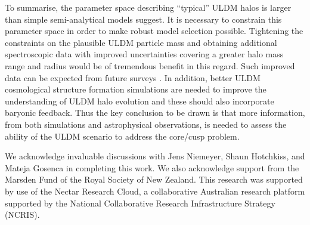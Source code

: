 \documentclass{pasa}%
\begin{document}
To summarise, the parameter space describing ``typical'' ULDM halos is larger than simple semi-analytical models suggest. It is necessary to constrain this parameter space in order to make robust model selection possible. Tightening the constraints on the plausible ULDM particle mass \cite{Castellano:2019hdd, Lidz:2018fqo, Davoudiasl:2019nlo} and obtaining additional spectroscopic data with improved uncertainties covering a greater halo mass range and radius would be of tremendous benefit in this regard. Such improved data can be expected from future surveys \cite{Simon:2019kmm}. In addition, better ULDM cosmological structure formation simulations are needed to  improve the understanding of ULDM halo evolution \cite{Lin:2018whl, Clough:2018exo, Mocz:2015sda} and these should also incorporate baryonic feedback. Thus the key conclusion to be drawn is that more information, from both simulations and astrophysical observations, is needed  to  assess the ability of the ULDM scenario to address the core/cusp problem. 



\begin{acknowledgements}
We acknowledge invaluable discussions with Jens Niemeyer, Shaun Hotchkiss, and Mateja Gosenca in completing this work. We also acknowledge support from the Marsden Fund of the Royal Society of New Zealand. This research was supported by use of the Nectar Research Cloud, a collaborative Australian research platform supported by the National Collaborative Research Infrastructure Strategy (NCRIS).

\end{acknowledgements}
\end{document}
